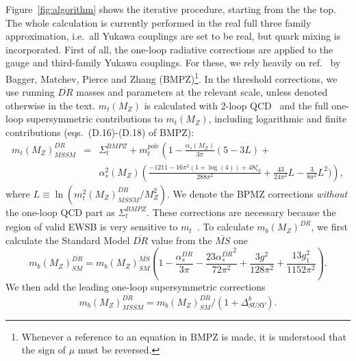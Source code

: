 \documentclass[]{article}
\begin{document}
Figure~\ref{fig:algorithm} shows the iterative procedure, starting from the the
top. The whole calculation is currently performed in the real full three family
approximation, i.e.\ all Yukawa couplings are set to be real, but quark mixing
is incorporated.
First of all, the one-loop radiative corrections are applied to the gauge
and third-family Yukawa couplings. For these, we rely heavily on
ref.~\cite{Pierce:1997zz}
by Bagger, Matchev, Pierce and Zhang (BMPZ)\footnote{Whenever a reference to
an equation in BMPZ is made, it is understood that the sign of $\mu$ must be
reversed.}.
In the threshold corrections, we use running $\overline{DR}$
masses and parameters at the relevant scale, unless denoted otherwise in the
text. 
$m_t(M_Z)$ is calculated with 2-loop QCD~\cite{avdeev} and
the full one-loop supersymmetric
contributions to $m_t(M_Z)$, including logarithmic and finite contributions
(eqs.~(D.16)-(D.18) of BMPZ):
\begin{eqnarray}
m_t(M_Z)^{\overline{DR}}_{MSSM} &=& \Sigma_t^{BMPZ} + m_t^{pole} \left( 1- \frac{\alpha_s(M_Z)}{3
  \pi} (5-3L)
+ \right. \nonumber \\ 
&& 
\alpha_s^2(M_Z) \left( \frac{-1211-16\pi^2(1+\log(4))+48 \zeta_3}{288 \pi^2}
 + \frac{43}{24 \pi^2} L - \frac{3}{8 \pi^2} L^2) 
\right),
\end{eqnarray}
where $L\equiv \ln ({m_t^2(M_Z)^{\overline{DR}}_{MSSM}} / M_Z^2)$.
We denote the BPMZ corrections {\em without}\/ the one-loop QCD part as
$\Sigma_t^{BMPZ}$. 
These corrections are necessary because the region of valid EWSB is very
sensitive to $m_t$~\cite{Allanach:2000ii}. 
To calculate $m_b(M_Z)^{\overline{DR}}$, we first calculate the Standard Model
$\overline{DR}$ value from the $\overline{MS}$ one~\cite{avdeev,bottomMass}
\begin{equation}
m_b(M_Z)^{\overline{DR}}_{SM} =
m_b(M_Z)^{\overline{MS}}_{SM} \left(1 - \frac{\alpha_s^{\overline{DR}}}{3 \pi}
- \frac{23 
  {\alpha_s^{\overline{DR}}}^2}{72 \pi^2} + 
\frac{3 g^2}{128 \pi^2} + \frac{13 g_1^2}{1152 \pi^2} \right).
\end{equation}
We then add the leading one-loop supersymmetric corrections
\begin{equation}
m_b(M_Z)^{\overline{DR}}_{MSSM}=m_b(M_Z)^{\overline{DR}}_{SM} / (1 +
  \Delta_{SUSY}^b).
\end{equation}
\end{document}
